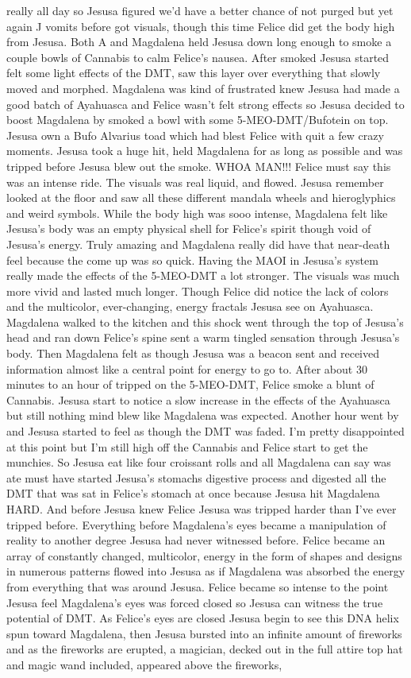 \documentclass[12pt]{book}
\begin{document}
really all day so Jesusa figured we'd have a better chance of not purged but yet again J vomits before got visuals, though this time Felice did get the body high from Jesusa. Both A and Magdalena held Jesusa down long enough to smoke a couple bowls of Cannabis to calm Felice's nausea. After smoked Jesusa started felt some light effects of the DMT, saw this layer over everything that slowly moved and morphed. Magdalena was kind of frustrated knew Jesusa had made a good batch of Ayahuasca and Felice wasn't felt strong effects so Jesusa decided to boost Magdalena by smoked a bowl with some 5-MEO-DMT/Bufotein on top. Jesusa own a Bufo Alvarius toad which had blest Felice with quit a few crazy moments. Jesusa took a huge hit, held Magdalena for as long as possible and was tripped before Jesusa blew out the smoke. WHOA MAN!!! Felice must say this was an intense ride. The visuals was real liquid, and flowed. Jesusa remember looked at the floor and saw all these different mandala wheels and hieroglyphics and weird symbols. While the body high was sooo intense, Magdalena felt like Jesusa's body was an empty physical shell for Felice's spirit though void of Jesusa's energy. Truly amazing and Magdalena really did have that near-death feel because the come up was so quick. Having the MAOI in Jesusa's system really made the effects of the 5-MEO-DMT a lot stronger. The visuals was much more vivid and lasted much longer. Though Felice did notice the lack of colors and the multicolor, ever-changing, energy fractals Jesusa see on Ayahuasca. Magdalena walked to the kitchen and this shock went through the top of Jesusa's head and ran down Felice's spine sent a warm tingled sensation through Jesusa's body. Then Magdalena felt as though Jesusa was a beacon sent and received information almost like a central point for energy to go to. After about 30 minutes to an hour of tripped on the 5-MEO-DMT, Felice smoke a blunt of Cannabis. Jesusa start to notice a slow increase in the effects of the Ayahuasca but still nothing mind blew like Magdalena was expected. Another hour went by and Jesusa started to feel as though the DMT was faded. I'm pretty disappointed at this point but I'm still high off the Cannabis and Felice start to get the munchies. So Jesusa eat like four croissant rolls and all Magdalena can say was ate must have started Jesusa's stomachs digestive process and digested all the DMT that was sat in Felice's stomach at once because Jesusa hit Magdalena HARD. And before Jesusa knew Felice Jesusa was tripped harder than I've ever tripped before. Everything before Magdalena's eyes became a manipulation of reality to another degree Jesusa had never witnessed before. Felice became an array of constantly changed, multicolor, energy in the form of shapes and designs in numerous patterns flowed into Jesusa as if Magdalena was absorbed the energy from everything that was around Jesusa. Felice became so intense to the point Jesusa feel Magdalena's eyes was forced closed so Jesusa can witness the true potential of DMT. As Felice's eyes are closed Jesusa begin to see this DNA helix spun toward Magdalena, then Jesusa bursted into an infinite amount of fireworks and as the fireworks are erupted, a magician, decked out in the full attire top hat and magic wand included, appeared above the fireworks, 
\end{document}

